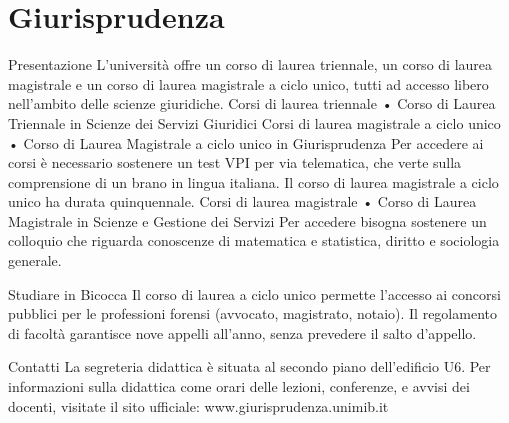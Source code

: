 \section{Giurisprudenza}

Presentazione
L'università offre un corso di laurea triennale, un corso di laurea magistrale e un corso di laurea magistrale a ciclo unico, tutti ad accesso libero nell'ambito delle scienze giuridiche.
Corsi di laurea triennale
     • Corso di Laurea Triennale in Scienze dei Servizi Giuridici 
Corsi di laurea magistrale a ciclo unico
     • Corso di Laurea Magistrale a ciclo unico in Giurisprudenza 
Per accedere ai corsi è necessario sostenere un test VPI per via telematica, che verte sulla comprensione di un brano in lingua italiana. Il corso di laurea magistrale a ciclo unico ha durata quinquennale. 
Corsi di laurea magistrale
     • Corso di Laurea Magistrale in Scienze e Gestione dei Servizi 
Per accedere bisogna sostenere un colloquio che riguarda conoscenze di matematica e statistica, diritto e sociologia generale. 

Studiare in Bicocca
Il corso di laurea a ciclo unico permette l'accesso ai concorsi pubblici per le professioni forensi (avvocato, magistrato, notaio). Il regolamento di facoltà garantisce nove appelli all'anno, senza prevedere il salto d'appello. 

Contatti
La segreteria didattica è situata al secondo piano dell'edificio U6. Per informazioni sulla didattica come orari delle lezioni, conferenze, e avvisi dei docenti, visitate il sito ufficiale: www.giurisprudenza.unimib.it 
